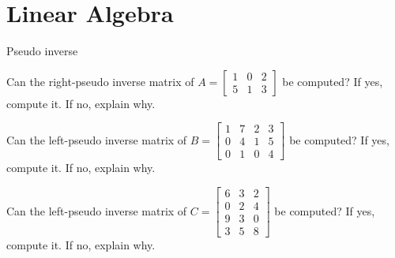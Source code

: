 \documentclass[
	ngerman,
	points=true,%
    solution=true,
    accentcolor=9c,
    colorbacktitle
	]{tudaexercise}
\begin{document}
\section*{Linear Algebra}
\begin{task}{Pseudo inverse}
\begin{subtask}
Can the right-pseudo inverse matrix of 
$A = 
\begin{bmatrix}
    1 & 0 & 2\\
    5 & 1 & 3
\end{bmatrix}
$ be computed? If yes, compute it. If no, explain why.
\end{subtask}
\begin{solution}

\end{solution}

\begin{subtask}
Can the left-pseudo inverse matrix of 
$B = 
\begin{bmatrix}
    1 & 7 & 2 & 3\\
    0 & 4 & 1 & 5\\
    0 & 1 & 0 & 4
\end{bmatrix}
$ be computed? If yes, compute it. If no, explain why.
\end{subtask}
\begin{solution}

\end{solution}

\begin{subtask}
Can the left-pseudo inverse matrix of 
$C = 
\begin{bmatrix}
    6 & 3 & 2\\
    0 & 2 & 4\\
    9 & 3 & 0\\
    3 & 5 & 8
\end{bmatrix}
$ be computed? If yes, compute it. If no, explain why.
\end{subtask}
\begin{solution}

\end{solution}
\end{task}
\end{document}
